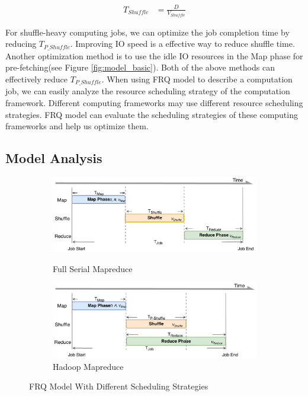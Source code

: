 {\begin{equation}
\label{equation_Tshuffle}
\begin{aligned}
    T_{Shuffle} &= {{\frac{D}{V_{Shuffle}}}}
\end{aligned}
\end{equation}

For shuffle-heavy computing jobs, we can optimize the job completion time by reducing \(T_{P\_Shuffle}\). Improving IO speed is a effective way to reduce shuffle time. Another optimization method is to use the idle IO resources in the Map phase for pre-fetching(see Figure \ref{fig:model_basic}). Both of the above methods can effectively reduce \(T_{P\_Shuffle}\). When using FRQ model to describe a computation job, we can easily analyze the resource scheduling strategy of the computation framework. Different computing frameworks may use different resource scheduling strategies. FRQ model can evaluate the scheduling strategies of these computing frameworks and help us optimize them.

\subsection{Model Analysis}\label{model_analysis}

\begin{figure}
	\centering
	\begin{minipage}[hb]{\linewidth}
		\begin{subfigure}{\linewidth}
			\begin{minipage}{\linewidth}
				\includegraphics[width=\linewidth]{fig/model_original}
				\caption{\color{blue}Full Serial Mapreduce}
				\label{fig:model_original}
			\end{minipage}
			\begin{minipage}{\linewidth}
				\includegraphics[width=\linewidth]{fig/model_hadoop}
				\caption{\color{blue}Hadoop Mapreduce}
				\label{fig:model_hadoop}
			\end{minipage}
		\end{subfigure}
		\caption{\color{blue}FRQ Model With Different Scheduling Strategies}
		\label{fig:model_strategies}
	\end{minipage}
\end{figure}

}
